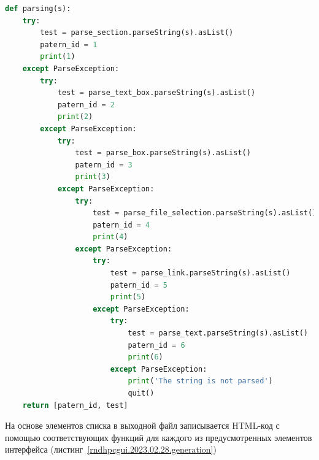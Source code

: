 \begin{lstlisting}[frame=single, label={rndhpcgui.2023.02.28.parsing}, caption={Функция parsing}, language={Python}] 
	def parsing(s):
    try:
        test = parse_section.parseString(s).asList()
        patern_id = 1
        print(1)
    except ParseException:
        try:
            test = parse_text_box.parseString(s).asList()
            patern_id = 2
            print(2)
        except ParseException:
            try:
                test = parse_box.parseString(s).asList()
                patern_id = 3
                print(3)
            except ParseException:
                try:
                    test = parse_file_selection.parseString(s).asList()
                    patern_id = 4
                    print(4)
                except ParseException:
                    try:
                        test = parse_link.parseString(s).asList()
                        patern_id = 5
                        print(5)
                    except ParseException:
                        try:
                            test = parse_text.parseString(s).asList()
                            patern_id = 6
                            print(6)
                        except ParseException:
                            print('The string is not parsed')
                            quit()
    return [patern_id, test]
\end{lstlisting}

На основе элементов списка в выходной файл записывается HTML-код с помощью соответствующих функций для каждого из предусмотренных элементов интерфейса (листинг~\ref{rndhpcgui.2023.02.28.generation})

